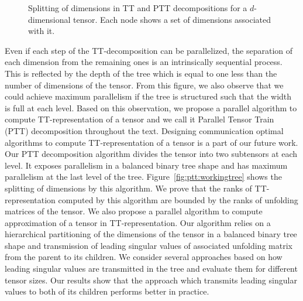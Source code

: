 \documentclass[runningheads]{llncs}
\begin{document}
\begin{figure}[!t]
\begin{center}
{
		}
		\caption{Splitting of dimensions in TT and PTT decompositions for a $d$-dimensional tensor. Each node shows a set of dimensions associated with it.~\label{fig:tt:ptt}}
	\end{center}
\end{figure} 
Even if each step of the TT-decomposition can be parallelized, the separation of each dimension from the remaining ones is an intrinsically sequential process. This is reflected by the depth of the tree which is equal to one less than the number of dimensions of the tensor. From this figure, we also observe that we could achieve maximum parallelism if the tree is structured such that the width is full at each level. Based on this observation, we propose a parallel algorithm to compute TT-representation of a tensor and we call it Parallel Tensor Train (PTT) decomposition throughout the text. Designing communication optimal algorithms to compute TT-representation of a tensor is a part of our future work. Our PTT decomposition algorithm divides the tensor into two subtensors at each level. It exposes parallelism in a balanced binary tree shape and has maximum parallelism at the last level of the tree. Figure~\ref{fig:ptt:workingtree} shows the splitting of dimensions by this algorithm. We prove that the ranks of TT-representation computed by this algorithm are bounded by the ranks of unfolding matrices of the tensor. We also propose a parallel algorithm to compute approximation of a tensor in TT-representation. Our algorithm relies on a hierarchical partitioning of the dimensions of the tensor in a balanced binary tree shape and transmission of leading singular values of associated unfolding matrix from the parent to its children. We consider several approaches based on how leading singular values are transmitted in the tree and  evaluate them for different tensor sizes. Our results show that the approach which transmits leading singular values to both of its children performs better in practice.

\end{document}
